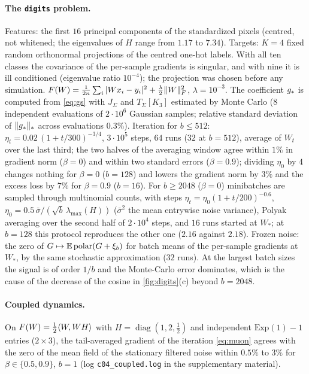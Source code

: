 \paragraph{The \texttt{digits} problem.} Features: the first $16$ principal components of the standardized pixels
(centred, not whitened; the eigenvalues of $H$ range from $1.17$ to $7.34$). Targets: $K=4$ fixed random orthonormal
projections of the centred one-hot labels. With all ten classes the covariance of the per-sample gradients is
singular, and with nine it is ill conditioned (eigenvalue ratio $10^{-4}$); the projection was chosen before any
simulation. $F(W)=\frac1{2n}\sum_i|Wx_i-y_i|^2+\frac\lambda2\|W\|_{F}^2$, $\lambda=10^{-3}$. The coefficient $g_\ast$ is computed
from \eqref{eq:gs} with $J_\Sigma$ and $T_\Sigma[K_3]$ estimated by Monte Carlo ($8$ independent evaluations of
$2\cdot10^6$ Gaussian samples; relative standard deviation of $\|g_\ast\|_{*}$ across evaluations $0.3\%$). Iteration for
$b\le512$: $\eta_t=0.02\,(1+t/300)^{-3/4}$, $3\cdot10^5$ steps, $64$ runs ($32$ at $b=512$), average of $W_t$ over the last third; the two
halves of the averaging window agree within $1\%$ in gradient norm ($\beta=0$) and within two standard errors
($\beta=0.9$); dividing $\eta_0$ by $4$ changes nothing for $\beta=0$ ($b=128$) and lowers the gradient norm by $3\%$ and
the excess loss by $7\%$ for $\beta=0.9$ ($b=16$). For $b\ge2048$ ($\beta=0$) minibatches are sampled through
multinomial counts, with steps $\eta_t=\eta_0(1+t/200)^{-0.6}$, $\eta_0=0.5\,\bar\sigma/(\sqrt b\,\lambda_{\max}(H))$
($\bar\sigma^2$ the mean entrywise noise variance), Polyak averaging over the second half of $2\cdot10^4$ steps, and
$16$ runs started at $W_\ast$; at $b=128$ this protocol reproduces the other one ($2.16$ against $2.18$). Frozen noise: the zero of $G\mapsto\mathbb{E}\operatorname{polar}(G+\xi_b)$ for batch means of the per-sample gradients at
$W_\ast$, by the same stochastic approximation ($32$ runs). At the largest batch sizes the signal is of order $1/b$ and
the Monte-Carlo error dominates, which is the cause of the decrease of the cosine in \cref{fig:digits}(c) beyond
$b=2048$.

\paragraph{Coupled dynamics.} On $F(W)=\frac12\langle W, WH\rangle$ with $H=\operatorname{diag}(1,2,\frac12)$ and independent
$\mathrm{Exp}(1)-1$ entries ($2\times3$), the tail-averaged gradient of the iteration \eqref{eq:muon} agrees with the
zero of the mean field of the stationary filtered noise within $0.5\%$ to $3\%$ for $\beta\in\{0.5,0.9\}$, $b=1$
(log \texttt{c04\_coupled.log} in the supplementary material).
